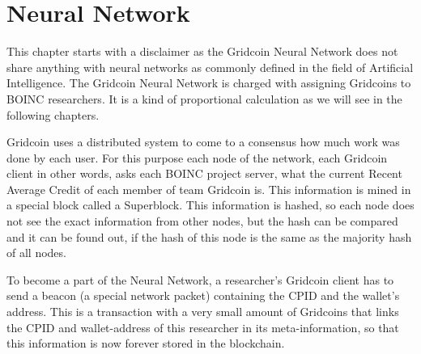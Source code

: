 \section{Neural Network}

This chapter starts with a disclaimer as the Gridcoin Neural Network does not share anything with neural networks as commonly defined in the field of Artificial Intelligence. The Gridcoin Neural Network is charged with assigning Gridcoins to BOINC researchers. It is a kind of proportional calculation as we will see in the following chapters.

Gridcoin uses a distributed system to come to a consensus how much work was done by each user. For this purpose each node of the network, each Gridcoin client in other words, asks each BOINC project server, what the current Recent Average Credit of each member of team Gridcoin is. This information is mined in a special block called a Superblock. This information is hashed, so each node does not see the exact information from other nodes, but the hash can be compared and it can be found out, if the hash of this node is the same as the majority hash of all nodes.

To become a part of the Neural Network, a researcher's Gridcoin client has to send a beacon (a special network packet) containing the CPID and the wallet's address. This is a transaction with a very small amount of Gridcoins that links  the CPID  and wallet-address of this researcher in its meta-information, so that this information is now forever stored in the blockchain.

